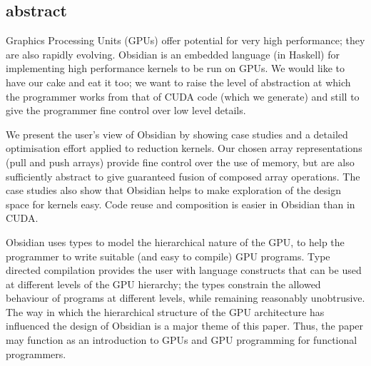 


%
\subsection*{abstract}

Graphics Processing Units (GPUs) offer potential for very high performance;
they are also rapidly evolving. Obsidian is an embedded language (in Haskell) 
for implementing high performance kernels to be run on GPUs. We would like to 
have our cake and eat it too; we want to raise the level of abstraction at 
which the programmer works from that of CUDA code (which we generate) and 
still to give the programmer fine control over low level details.

We present the user's view of Obsidian by showing case studies and a 
detailed optimisation effort applied to reduction kernels. Our chosen array 
representations (pull and push arrays) provide fine control over the use of 
memory, but are also sufficiently abstract to give guaranteed fusion of composed 
array operations. The case studies also show that Obsidian helps to make 
exploration of the design space for kernels easy. Code reuse 
and composition is easier in Obsidian than in CUDA. 

Obsidian uses types to model the hierarchical nature of the GPU, to help 
the programmer to write suitable (and easy to compile) GPU programs. Type 
directed compilation provides the user with language constructs that can be 
used at different levels of the GPU hierarchy; the types constrain the allowed 
behaviour of programs at different levels, while remaining reasonably unobtrusive.
The way in which the hierarchical structure of the GPU architecture
has influenced the design of Obsidian is a major theme of this paper.
Thus, the paper may function as an introduction to GPUs and GPU programming 
for functional programmers.



